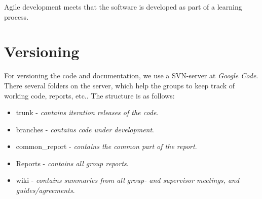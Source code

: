 Agile development meets that the software is developed as part of a learning process.

\section{Versioning}
For versioning the code and documentation, we use a SVN-server at \textit{Google Code}\cite{web:googlecode}.\\

There several folders on the server, which help the groups to keep track of working code, reports, etc.. The structure is as follows:
	\begin{itemize}
		\item trunk - \textit{contains iteration releases of the code}.
		\item branches - \textit{contains code under development}.
		\item common\_report - \textit{contains the common part of the report}.
		\item Reports - \textit{contains all group reports}.
		\item wiki - \textit{contains summaries from all group- and supervisor meetings, and guides/agreements}.
	\end{itemize}